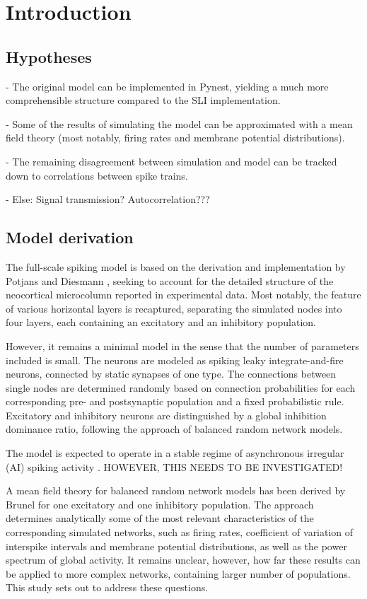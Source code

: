 \section{Introduction}
\label{sec:intro}
\subsection{Hypotheses}
- The original model can be implemented in Pynest, yielding a much more 
comprehensible structure compared to the SLI implementation. 

- Some of the results of simulating the model can be approximated with a 
mean field theory (most notably, firing rates and membrane potential
distributions).

- The remaining disagreement between simulation and model can be tracked 
down to correlations between spike trains.

- Else: Signal transmission? Autocorrelation???

\subsection{Model derivation}
The full-scale spiking model is based on the derivation and implementation 
by Potjans and Diesmann \cite{2014}, seeking to account for the detailed 
structure of the neocortical microcolumn reported in experimental data. 
Most notably, the feature of various horizontal layers is recaptured, 
separating the simulated nodes into four layers, each containing an 
excitatory and an inhibitory population. 

However, it remains a minimal model in the sense that the number of 
parameters included is small. The neurons are modeled as spiking leaky 
integrate-and-fire neurons, connected by static synapses of one type. 
The connections between single nodes are determined randomly based on 
connection probabilities for each corresponding pre- and postsynaptic 
population and a fixed probabilistic rule. Excitatory and inhibitory 
neurons are distinguished by a global inhibition dominance ratio, following
the approach of balanced random network models.

The model is expected to operate in a stable regime of asynchronous irregular 
(AI) spiking activity \cite{brunel2000}. HOWEVER, THIS NEEDS TO BE INVESTIGATED!

A mean field theory for balanced random network models has been derived by 
Brunel \cite{brunel2000} for one excitatory and one inhibitory population. 
The approach determines analytically some of the most relevant characteristics
of the corresponding simulated networks, such as firing rates, coefficient 
of variation of interspike intervals and membrane potential distributions, 
as well as the power spectrum of global activity. It remains unclear, however, 
how far these results can be applied to more complex networks, containing 
larger number of populations. This study sets out to address these questions. 

